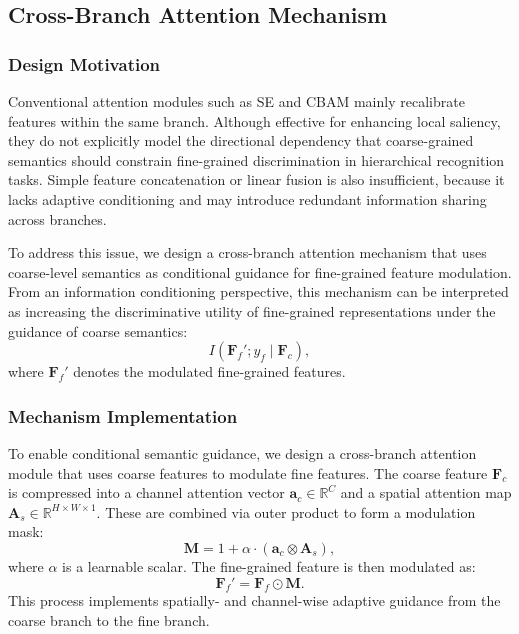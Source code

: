 \documentclass[pdflatex,sn-mathphys-num]{sn-jnl}
\theoremstyle{thmstyleone}%
\theoremstyle{thmstyletwo}%
\theoremstyle{thmstylethree}%
\begin{document}
\subsection{Cross-Branch Attention Mechanism}
\label{sec:cba}

\subsubsection{Design Motivation}

Conventional attention modules such as SE and CBAM mainly recalibrate features within the same branch. Although effective for enhancing local saliency, they do not explicitly model the directional dependency that coarse-grained semantics should constrain fine-grained discrimination in hierarchical recognition tasks. Simple feature concatenation or linear fusion is also insufficient, because it lacks adaptive conditioning and may introduce redundant information sharing across branches.

To address this issue, we design a cross-branch attention mechanism that uses coarse-level semantics as conditional guidance for fine-grained feature modulation. From an information conditioning perspective, this mechanism can be interpreted as increasing the discriminative utility of fine-grained representations under the guidance of coarse semantics:
\begin{equation}
I(\mathbf{F}_f'; y_f \mid \mathbf{F}_c),
\end{equation}
where $\mathbf{F}_f'$ denotes the modulated fine-grained features.

\subsubsection{Mechanism Implementation}
To enable conditional semantic guidance, we design a cross-branch attention module that uses coarse features to modulate fine features. The coarse feature $\mathbf{F}_c$ is compressed into a channel attention vector $\mathbf{a}_c \in \mathbb{R}^C$ and a spatial attention map $\mathbf{A}_s \in \mathbb{R}^{H \times W \times 1}$. These are combined via outer product to form a modulation mask:
\begin{equation}
\mathbf{M} = 1 + \alpha \cdot (\mathbf{a}_c \otimes \mathbf{A}_s),
\label{eq:attention_mask}
\end{equation}
where $\alpha$ is a learnable scalar. The fine-grained feature is then modulated as:
\begin{equation}
\mathbf{F}_f' = \mathbf{F}_f \odot \mathbf{M}.
\label{eq:feature_modulation}
\end{equation}
This process implements spatially- and channel-wise adaptive guidance from the coarse branch to the fine branch.
\end{document}

